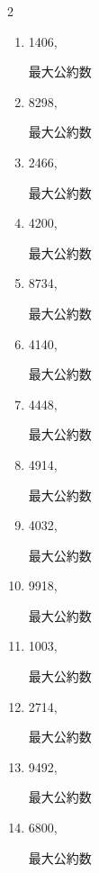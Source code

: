 \begin{multicols}{2}
\begin{enumerate}
        最大公約数

  \item 1406,

        最大公約数

  \item 8298,

        最大公約数

  \item 2466,

        最大公約数

  \item 4200,

        最大公約数

\columnbreak %

\resetques

  \item 8734,

        最大公約数

  \item 4140,

        最大公約数

  \item 4448,

        最大公約数

  \item 4914,

        最大公約数

  \item 4032,

        最大公約数

\columnbreak %

  \item 9918,

        最大公約数

  \item 1003,

        最大公約数

  \item 2714,

        最大公約数

  \item 9492,

        最大公約数

  \item 6800,

        最大公約数

\columnbreak %


\end{enumerate}
\end{multicols}
